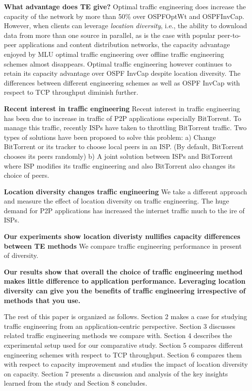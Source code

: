\textbf{What advantage does TE give?}
Optimal traffic engineering does increase the capacity of the network by more than 50\% over OSPFOptWt and OSPFInvCap.  However, when clients can leverage {\em location diversity}, i.e., the ability to download data from more than one source in parallel, as is the case with popular peer-to-peer applications and content distribution networks, the capacity advantage enjoyed by MLU optimal traffic engineering over offline traffic engineering schemes almost disappears.  Optimal traffic engineering however continues to retain its capacity advantage over OSPF InvCap despite location diversity. The differences between different engineering schemes as well as OSPF InvCap with respect to TCP throughput diminish further.

\textbf{Recent interest in traffic engineering}
Recent interest in traffic engineering has been due to increase in traffic of P2P applications especially BitTorrent. To manage this traffic, recently ISPs have taken to throttling BitTorrent traffic. Two types of solutions have been proposed to solve this problem: a) Change BitTorrent or its tracker to choose local peers in an ISP. (By default, BitTorrent chooses its peers randomly) b) A joint solution between ISPs and BitTorrent where ISP modifies its traffic engineering and also BitTorrent also changes its choice of peers.

\textbf{Location diversity changes traffic engineering}
We take a different approach and measure the effect of location diversity on traffic engineering. The huge demand for P2P applications has increased the internet traffic much to the ire of ISPs. 


\textbf{Our experiments show location diveristy nullifies capacity differences between TE methods}
We compare traffic engineering performance in present of diversity.


\textbf{Our results show that overall the choice of traffic engineering method makes little difference to application performance. Leveraging location diversity can give you the benefits of traffic engineering irrespective of methods that you use.}

The rest of this paper is organized as follows. Section 2 makes a case for studying traffic engineering from an application-centric perspective. Section 3 discusses related traffic engineering methods we compare with. Section 4 describes the experimental setup used for our comparative study. Section 5 compares different engineering schemes with respect to TCP throughput. Section 6 compares them with respect to capacity improvement and studies the impact of location diversity on capacity. Section 7 presents a discussion and analysis of the key insights learned from the study and Section 8 concludes.


